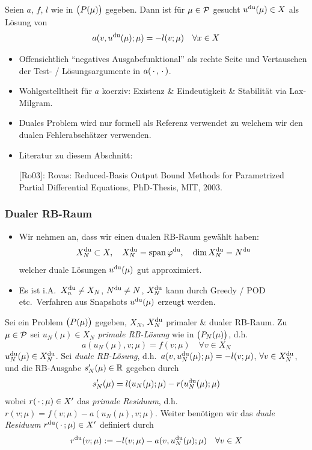 \begin{defn}
	Seien $a$, $f$, $l$ wie in $\big(P(\mu)\big)$ gegeben. Dann ist für $\mu \in \mathcal{P}$ gesucht $u^{\mathrm{du}}(\mu) \in X$ als Lösung von
	\[
		a(v,u^{\mathrm{du}}(\mu);\mu) = -l(v;\mu) \quad \forall x \in X
	\]
\end{defn}

\begin{bem} \beginwithlistbem
	\begin{itemize}
		\item Offensichtlich ``negatives Ausgabefunktional'' als rechte Seite und Vertauschen der Test- / Lösungsargumente in $a(\,\cdot\,,\,\cdot\,)$.
		\item Wohlgestelltheit für $a$ koerziv: Existenz \& Eindeutigkeit \& Stabilität via Lax-Milgram.
		\item Duales Problem wird nur formell als Referenz verwendet zu welchem wir den dualen Fehlerabschätzer verwenden.
		\item Literatur zu diesem Abschnitt:

			[Ro03]: Rovas: Reduced-Basis Output Bound Methods for Parametrized Partial Differential Equations, PhD-Thesis, MIT, 2003.
	\end{itemize}
\end{bem}

\subsubsection*{Dualer RB-Raum}

\begin{itemize}
	\item Wir nehmen an, dass wir einen dualen RB-Raum gewählt haben:
		\[
			X_N^\du \subset X, \quad X_N^\du = \spn{\varphi^\du}, \quad \dim{X_N^\du} = N^\du
		\]
		welcher duale Lösungen $u^{\mathrm{du}}(\mu)$ gut approximiert.
	\item Es ist i.A.\ $X_n^{\mathrm{du}} \neq X_N$, $N^{\mathrm{du}} \neq N$, $X_N^{\mathrm{du}}$ kann durch Greedy / POD etc.\ Verfahren aus Snapshots $u^{\mathrm{du}}(\mu)$ erzeugt werden.
\end{itemize}

\begin{defn}
	Sei ein Problem $\big(P(\mu)\big)$ gegeben, $X_N$, $X_N^{\mathrm{du}}$ primaler \& dualer RB-Raum.
	Zu $\mu \in \mathcal{P}$ sei $u_N(\mu) \in X_N$ \emph{primale RB-Lösung} wie in $\big(P_N(\mu)\big)$, d.h.
	\[
		a(u_N(\mu),v;\mu) = f(v;\mu) \quad \forall v \in X_N
	\]
	$u_N^{\mathrm{du}}(\mu) \in X_N^{\mathrm{du}}$. Sei \emph{duale RB-Lösung}, d.h.\ $a(v,u_N^{\mathrm{du}}(\mu);\mu) = -l(v;\mu)$, $\forall v \in X_N^{\mathrm{du}}$, und die RB-Ausgabe $s_N'(\mu) \in \mathbb{R}$ gegeben durch
	\begin{equation} \label{eq:3.25}
		s_N'(\mu) = l(u_N(\mu);\mu) - r(u_N^{\mathrm{du}}(\mu);\mu)
	\end{equation}
	wobei $r(\,\cdot\,;\mu) \in X'$ das \emph{primale Residuum}, d.h.\ $r(v;\mu) = f(v;\mu) - a(u_N(\mu),v;\mu)$.
	Weiter benötigen wir das \emph{duale Residuum} $r^{\mathrm{du}}(\,\cdot\,;\mu) \in X'$ definiert durch
	\[
		r^{\mathrm{du}}(v;\mu) := -l(v;\mu) - a(v,u_N^{\mathrm{du}}(\mu);\mu) \quad \forall v \in X
	\]
\end{defn}

